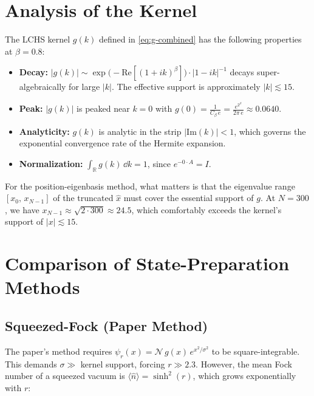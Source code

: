 \documentclass[11pt]{article}
\begin{document}
\section{Analysis of the Kernel}

The LCHS kernel $g(k)$ defined in \cref{eq:g-combined} has the following
properties at $\beta = 0.8$:

\begin{itemize}
  \item \textbf{Decay:} $|g(k)| \sim \exp\bigl(-\mathrm{Re}[(1+ik)^\beta]\bigr)
        \cdot |1-ik|^{-1}$ decays super-algebraically for large $|k|$.
        The effective support is approximately $|k| \lesssim 15$.
  \item \textbf{Peak:} $|g(k)|$ is peaked near $k=0$ with
        $g(0) = \frac{1}{C_\beta\,e} = \frac{e^{2^\beta}}{2\pi\,e}
        \approx 0.0640$.
  \item \textbf{Analyticity:} $g(k)$ is analytic in the strip
        $|\mathrm{Im}(k)| < 1$, which governs the exponential convergence
        rate of the Hermite expansion.
  \item \textbf{Normalization:}
        $\int_{\mathbb{R}} g(k)\,\dd{k} = 1$, since $e^{-0\cdot A} = I$.
\end{itemize}

For the position-eigenbasis method, what matters is that the eigenvalue
range $[x_0,\, x_{N-1}]$ of the truncated $\hat{x}$ must cover the essential
support of $g$.  At $N = 300$, we have $x_{N-1} \approx \sqrt{2 \cdot 300}
\approx 24.5$, which comfortably exceeds the kernel's support of
$|x| \lesssim 15$.

\section{Comparison of State-Preparation Methods}

\subsection{Squeezed-Fock (Paper Method)}

The paper's method requires $\psi_r(x) = \mathcal{N}\,g(x)\,e^{x^2/\sigma^2}$
to be square-integrable.  This demands $\sigma \gg$ kernel support, forcing
$r \gg 2.3$.  However, the mean Fock number of a squeezed vacuum is
$\langle\hat{n}\rangle = \sinh^2(r)$, which grows exponentially with $r$:
\end{document}
